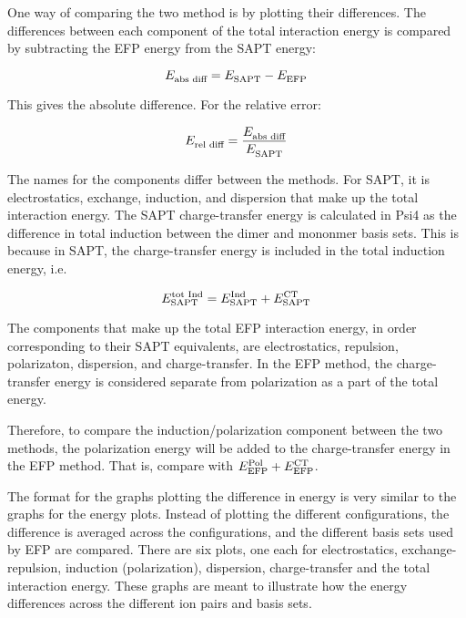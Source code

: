 
One way of comparing the two method is by plotting their differences.
The differences between each component of the total interaction energy is compared by subtracting the EFP energy from the SAPT energy:

\begin{equation*}
    \energ{abs diff} = \energ{SAPT} - \energ{EFP}
\end{equation*}

This gives the absolute difference. 
For the relative error: 

\begin{equation*}
    \energ{rel diff} = \frac{ \energ{abs diff} } { \energ{SAPT} }
\end{equation*}


The names for the components differ between the methods. 
For SAPT, it is electrostatics, exchange, induction, and dispersion that make up the total interaction energy. 
The SAPT charge-transfer energy is calculated in Psi4 as the difference in total induction between the dimer and mononmer basis sets. 
This is because in SAPT, the charge-transfer energy is included in the total induction energy, i.e.

\begin{equation*}
    \energ[tot Ind]{SAPT} = \energ[Ind]{SAPT} + \energ[CT]{SAPT}
\end{equation*}


The components that make up the total EFP interaction energy, in order corresponding to their SAPT equivalents, are electrostatics, repulsion, polarizaton, dispersion, and charge-transfer. 
In the EFP method, the charge-transfer energy is considered separate from polarization as a part of the total energy. 

Therefore, to compare the induction/polarization component between the two methods, the polarization energy will be added to the charge-transfer energy in the EFP method. 
That is, compare 
 with
$ \energ[Pol]{EFP} + \energ[CT]{EFP} $.


The format for the graphs plotting the difference in energy is very similar to the graphs for the energy plots. 
Instead of plotting the different configurations, the difference is averaged across the configurations, and the different basis sets used by EFP are compared. 
There are six plots, one each for electrostatics, exchange-repulsion, induction (polarization), dispersion, charge-transfer and the total interaction energy.
These graphs are meant to illustrate how the energy differences across the different ion pairs and basis sets.

